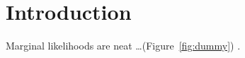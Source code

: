 \section{Introduction}

Marginal likelihoods are neat \ldots (Figure~\ref{fig:dummy}) \citep{Felsenstein1981}.
